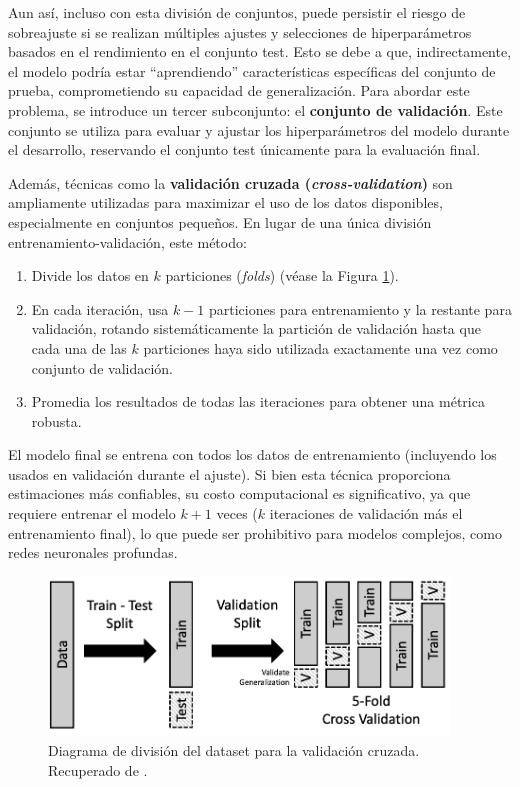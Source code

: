 Aun así, incluso con esta división de conjuntos, puede persistir el riesgo de sobreajuste si se realizan 
múltiples ajustes y selecciones de hiperparámetros basados en el rendimiento en el conjunto test.
Esto se debe a que, indirectamente, el modelo podría estar ``aprendiendo'' características específicas del 
conjunto de prueba, comprometiendo su capacidad de generalización. Para abordar este problema, se introduce 
un tercer subconjunto: el \textbf{conjunto de validación}. Este conjunto se utiliza para evaluar y ajustar 
los hiperparámetros del modelo durante el desarrollo, reservando el conjunto test únicamente para la 
evaluación final.

Además, técnicas como la \textbf{validación cruzada (\textit{cross-validation})} son ampliamente utilizadas 
para maximizar el uso de los datos disponibles, especialmente en conjuntos pequeños. En lugar de una única 
división entrenamiento-validación, este método:

\begin{enumerate}
    \item Divide los datos en $k$ particiones (\textit{folds}) (véase la Figura \ref{fig:CVDiagram}).
    \item En cada iteración, usa $k-1$ particiones para entrenamiento y la restante para validación, rotando
    sistemáticamente la partición de validación hasta que cada una de las $k$ particiones haya sido utilizada 
    exactamente una vez como conjunto de validación. 
    \item Promedia los resultados de todas las iteraciones para obtener una métrica robusta.
\end{enumerate}

El modelo final se entrena con todos los datos de entrenamiento (incluyendo los usados en validación durante 
el ajuste). Si bien esta técnica proporciona estimaciones más confiables, su costo computacional es 
significativo, ya que requiere entrenar el modelo $k+1$ veces ($k$ iteraciones de validación más el 
entrenamiento final), lo que puede ser prohibitivo para modelos complejos, como redes neuronales profundas.

\begin{figure}[h]
    \centering
    \includegraphics[width=0.95\textwidth]{capitulos/cap_02/imagenes/CVDiagram.png}
    \caption{
        Diagrama de división del dataset para la validación cruzada. 
        Recuperado de \cite{lau2023crossvalidation}.
    } 
    \label{fig:CVDiagram}
\end{figure}


